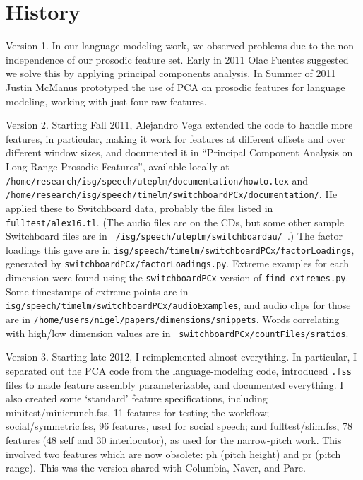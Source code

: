 \documentclass[11pt]{article}
\begin{document}
\section{History}

Version 1.  In our language  modeling work, we observed
problems due to the non-independence of our prosodic feature set.
Early in 2011 Olac Fuentes suggested we solve this by applying
principal components analysis.  In Summer of 2011 Justin McManus
prototyped the use of PCA on prosodic features for language modeling,
working with just four raw features.

Version 2. Starting Fall 2011, Alejandro Vega extended the code to
handle more features, in particular, making it work for features at
different offsets and over different window sizes, and documented it
in ``Principal Component Analysis on Long Range Prosodic Features'',
available locally at {\tt
  /home/research/isg/speech/uteplm/documentation/howto.tex} and {\tt
  /home/research/isg/speech/timelm/switchboardPCx/documentation/}.  He
applied these to Switchboard data, probably the files listed in {\tt
  fulltest/alex16.tl}.  (The audio files are on the CDs, but some
other sample Switchboard files are in {\tt
  /isg/speech/uteplm/switchboardau/ }.)  The factor loadings this
gave are in {\tt isg/speech/timelm/switchboardPCx/factorLoadings},
generated by {\tt switchboardPCx/factorLoadings.py}.  Extreme examples
for each dimension were found using the {\tt switchboardPCx} version
of {\tt find-extremes.py}.  Some timestamps of extreme points are in
{\tt isg/speech/timelm/switchboardPCx/audioExamples}, and audio clips
for those are in {\tt /home/users/nigel/papers/dimensions/snippets}.
Words correlating with high/low dimension values are in {\tt
  switchboardPCx/countFiles/sratios}.

Version 3. Starting late 2012, I reimplemented almost everything.  In
particular, I separated out the PCA code from the language-modeling
code, introduced {\tt .fss} files to made feature assembly
parameterizable, and documented everything.  I also created some
`standard' feature specifications, including minitest/minicrunch.fss,
11 features for testing the workflow; social/symmetric.fss, 96
features, used for social speech; and fulltest/slim.fss, 78 features
(48 self and 30 interlocutor), as used for the narrow-pitch work.
This involved two features which are now obsolete: ph (pitch height)
and pr (pitch range).  This was the version shared with Columbia,
Naver, and Parc.
\end{document}
